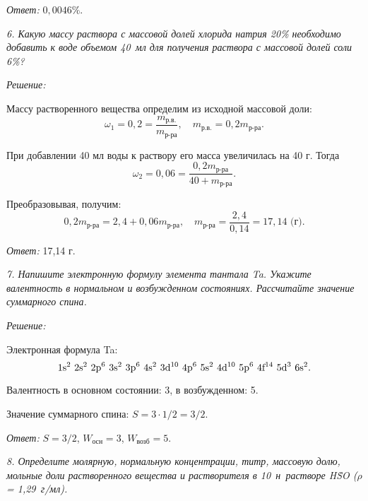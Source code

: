 \vspace*{2em}
\emph{Ответ:} \( 0,\!0046\% \).

\newpage %

\emph{6. Какую массу раствора с массовой долей хлорида натрия 20\% необходимо
добавить к воде объемом 40~мл для получения раствора с массовой долей соли 6\%?}

\vspace*{2em}
\emph{Решение:}

Массу растворенного вещества определим из исходной массовой доли:
\[
    \omega_1 = 0,\!2 = \frac{m_\text{р.в.}}{m_\text{р-ра}}, \quad
    m_\text{р.в.} = 0,\!2m_\text{р-ра}.
\]

При добавлении 40 мл воды к раствору его масса увеличилась на 40 г. Тогда
\[
    \omega_2 = 0,\!06 = \frac{0,\!2 m_\text{р-ра}}{40 + m_\text{р-ра}}.
\]

Преобразовывая, получим:
\[
    0,\!2m_\text{р-ра} = 2,\!4 + 0,\!06m_\text{р-ра}, \quad
    m_\text{р-ра} = \frac{2,\!4}{0,\!14} = 17,\!14 \text{ (г)}.
\]

\vspace*{2em}
\emph{Ответ:} 17,14 г.

\newpage %

\emph{7. Напишите электронную формулу элемента тантала Ta. Укажите валентность
в нормальном и возбужденном состояниях. Рассчитайте значение суммарного спина.}

\vspace*{2em}
\emph{Решение:}

Электронная формула Ta:
\[
    \text{1s\( ^{2} \) 2s\( ^{2} \) 2p\( ^{6} \) 3s\( ^{2} \) 3p\( ^{6} \) 4s\( ^{2} \) 3d\( ^{10} \) 4p\( ^{6} \)
    5s\( ^{2} \) 4d\( ^{10} \) 5p\( ^{6} \) 4f\( ^{14} \) 5d\( ^{3} \) 6s\( ^{2} \)}.
\]

Валентность в основном состоянии: 3, в возбужденном: 5.

Значение суммарного спина: \( S = 3\cdot 1/2 = 3/2 \).

\vspace*{2em}
\emph{Ответ:} \( S = 3/2 \), \( W_\text{осн} = 3 \), \( W_\text{возб} = 5 \).

\newpage %

\emph{8. Определите молярную, нормальную концентрации, титр, массовую долю,
мольные доли растворенного вещества и растворителя в 10~н~растворе
H\.SO (\( \rho \) = 1,29~г/мл).}

